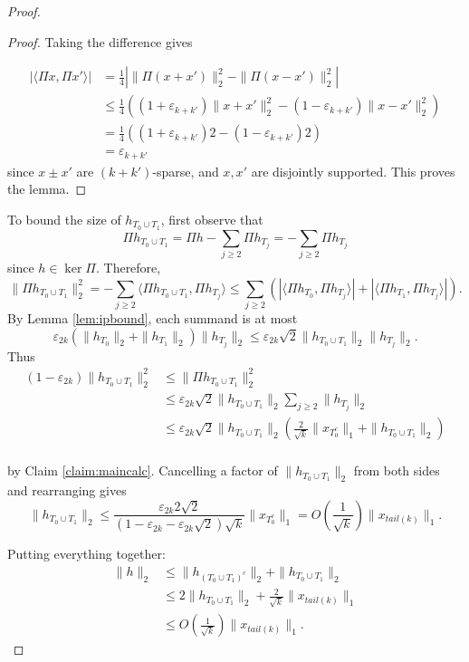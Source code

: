 \documentclass[11pt]{article}
\newcommand{\eps}{\varepsilon}
\begin{document}
\begin{proof}
\begin{proof}
Taking the difference gives

\begin{align*}
	|\langle \Pi x, \Pi x' \rangle | &= \frac{1}{4} \left|\|\Pi(x + 
	x')\|_2^2 - \|\Pi(x - x')\|_2^2\right|\\
	{}& \le \frac{1}{4}((1 + \eps_{k+k'})\|x+x'\|_2^2 - (1-\eps_{k
	+k'})\|x-x'\|_2^2)\\
	{}& = \frac{1}{4}((1 + \eps_{k+k'})2 - (1-\eps_{k+k'})2)\\
	{} &= \eps_{k+k'}
\end{align*}
since $x \pm x'$ are $(k+k')$-sparse, and $x,x'$ are disjointly 
supported. This proves the lemma.
\end{proof}

To bound the size of $h_{T_0 \cup T_1}$, first observe that
\[\Pi h_{T_0 \cup T_1} = \Pi h - \sum_{j \ge 2} \Pi h_{T_j} = - 
\sum_{j \ge 2} \Pi h_{T_j}\]
since $h \in \ker \Pi$. Therefore,
\[\|\Pi h_{T_0 \cup T_1} \|_2^2 = -\sum_{j \ge 2} \langle \Pi h_{T_0 
\cup T_1}, \Pi h_{T_j}\rangle \le \sum_{j \ge 2} (|\langle \Pi 
h_{T_0}, \Pi h_{T_j}\rangle| + |\langle \Pi h_{T_1}, \Pi h_{T_j}
\rangle|).\]
By Lemma \ref{lem:ipbound}, each summand is at most
\[\eps_{2k}(\|h_{T_0}\|_2 + \|h_{T_1}\|_2) \|h_{T_j}\|_2 \le 
\eps_{2k} \sqrt{2}\|h_{T_0\cup T_1}\|_2\|h_{T_j}\|_2.\]
Thus
\begin{align*}
(1 - \eps_{2k})\|h_{T_0 \cup T_1}\|_2^2 &\le \|\Pi h_{T_0 \cup T_1} 
\|_2^2 \\
&\le \eps_{2k}\sqrt{2} \|h_{T_0 \cup T_1}\|_2 \sum_{j\ge 2} \|h_{T_j}
\|_2 \\
&\le \eps_{2k}\sqrt{2} \|h_{T_0 \cup T_1}\|_2 \left(\frac{2}
{\sqrt{k}} \|x_{T_0^c}\|_1 + \|h_{T_0\cup T_1}\|_2\right)\\
\end{align*}

by Claim \ref{claim:maincalc}. Cancelling a factor of $\|h_{T_0 \cup 
T_1}\|_2$ from both sides and rearranging gives
\[\|h_{T_0 \cup T_1}\|_2 \le \frac{\eps_{2k}2\sqrt{2}}{(1 - \eps_{2k} 
- \eps_{2k}\sqrt{2})\sqrt{k}}\|x_{T_0^c}\|_1 = O\left(\frac{1}
{\sqrt{k}}\right) \|x_{tail(k)}\|_1.\]

Putting everything together:
\begin{align*}
\|h\|_2 &\le \|h_{(T_0 \cup T_1)^c}\|_2 + \|h_{T_0 \cup T_1}\|_2 \\
&\le 2 \|h_{T_0 \cup T_1}\|_2 + \frac{2}{\sqrt{k}} \|x_{tail(k)}\|_1 \\
&\le O\left(\frac{1}{\sqrt{k}}\right) \|x_{tail(k)}\|_1.
\end{align*}
\end{proof}
\end{document}
